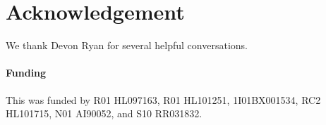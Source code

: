 \documentclass{bioinfo}
\begin{document}
\section*{Acknowledgement}
We thank Devon Ryan for several helpful conversations.
\paragraph{Funding\textcolon} This was funded by R01 HL097163, R01 HL101251, 1I01BX001534, RC2 HL101715, N01 AI90052, and S10 RR031832.
%
%
%
%
%
%
%
%
%



    
\end{document}
